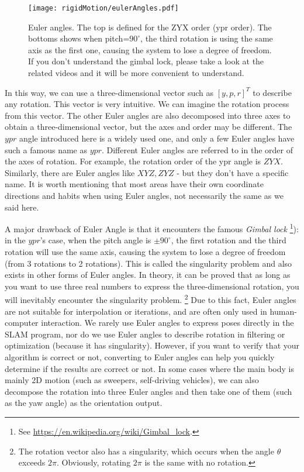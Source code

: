 \begin{figure}[!t]
    \centering
    \texttt{[image: rigidMotion/eulerAngles.pdf]}
    \caption{Euler angles. The top is defined for the ZYX order (ypr order). The bottoms shows when pitch=$90^\circ$, the third rotation is using the same axis as the first one, causing the system to lose a degree of freedom. If you don't understand the gimbal lock, please take a look at the related videos and it will be more convenient to understand. }
    \label{fig:eulerAngles}
\end{figure}

In this way, we can use a three-dimensional vector such as $[y,p,r]^T$ to describe any rotation. This vector is very intuitive. We can imagine the rotation process from this vector. The other Euler angles are also decomposed into three axes to obtain a three-dimensional vector, but the axes and order may be different. The $ypr$ angle introduced here is a widely used one, and only a few Euler angles have such a famous name as $ypr$. Different Euler angles are referred to in the order of the axes of rotation. For example, the rotation order of the ypr angle is $ZYX$. Similarly, there are Euler angles like $XYZ, ZYZ$ - but they don't have a specific name. It is worth mentioning that most areas have their own coordinate directions and habits when using Euler angles, not necessarily the same as we said here.

A major drawback of Euler Angle is that it encounters the famous \textit{Gimbal lock} \footnote{See \url{https://en.wikipedia.org/wiki/Gimbal_lock}.}): in the $ypr$'s case, when the pitch angle is $\pm 90 ^\circ $, the first rotation and the third rotation will use the same axis, causing the system to lose a degree of freedom (from 3 rotations to 2 rotations). This is called the singularity problem and also exists in other forms of Euler angles. In theory, it can be proved that as long as you want to use three real numbers to express the three-dimensional rotation, you will inevitably encounter the singularity problem. \footnote{The rotation vector also has a singularity, which occurs when the angle $\theta$ exceeds $2\pi$. Obviously, rotating $2\pi$ is the same with no rotation.} Due to this fact, Euler angles are not suitable for interpolation or iterations, and are often only used in human-computer interaction. We rarely use Euler angles to express poses directly in the SLAM program, nor do we use Euler angles to describe rotation in filtering or optimization (because it has singularity). However, if you want to verify that your algorithm is correct or not, converting to Euler angles can help you quickly determine if the results are correct or not. In some cases where the main body is mainly 2D motion (such as sweepers, self-driving vehicles), we can also decompose the rotation into three Euler angles and then take one of them (such as the yaw angle) as the orientation output.


